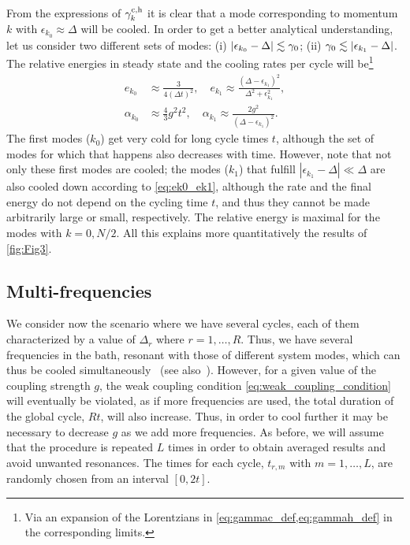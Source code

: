 \documentclass[aps,prx,twocolumn,superscriptaddress,nofootinbib,nolongbibliography,nobalancelastpage,10pt,floatfix]{revtex4-2}
\begin{document}
From the expressions of $\gamma^{\rm c,h}_k$ it is clear that a mode corresponding to momentum $k$ with $\epsilon_{k_0}\approx \Delta$ will be cooled. In order to get a better analytical understanding, let us consider two different sets of modes: (i) $|\epsilon_{k_0}- \Delta|\lesssim \gamma_0$; (ii) $\gamma_0\lesssim |\epsilon_{k_1}- \Delta|$. The relative energies in steady state and the cooling rates per cycle will be\footnote{Via an expansion of the Lorentzians in \cref{eq:gammac_def,eq:gammah_def} in the corresponding limits.}
\begin{align}
    \label{eq:ek0_ek1}
    e_{k_0}      &\approx \frac{3}{4(\Delta t)^2}, \quad  e_{k_1} \approx \frac{(\Delta-\epsilon_{k_1})^2}{\Delta^2+\epsilon_{k_1}^2},\\
    \alpha_{k_0} &\approx \frac{4}{3} g^2 t^2, \quad \alpha_{k_1} \approx \frac{2g^2}{(\Delta-\epsilon_{k_1})^2}.
    \label{eq:alpha01}
\end{align}
The first modes ($k_0$) get very cold for long cycle times $t$, although the set of modes for which that happens also decreases with time. However, note that not only these first modes are cooled; the modes ($k_1$) that fulfill $|\epsilon_{k_1}- \Delta|\ll \Delta$ are also cooled down according to \cref{eq:ek0_ek1}, although the rate and the final energy do not depend on the cycling time $t$, and thus they cannot be made arbitrarily large or small, respectively. The relative energy is maximal for the modes with $k=0,N/2$. All this explains more quantitatively the results of \cref{fig:Fig3}.


\subsection{Multi-frequencies}
\label{subsec:multi_freq}

We consider now the scenario where we have several cycles, each of them characterized by a value of $\Delta_r$ where $r=1,\ldots,R$. Thus, we have several frequencies in the bath, resonant with those of different system modes, which can thus be cooled simultaneously~\cite{Eschner2003Laser} (see also~\cite{Marti2025Efficient}). However, for a given value of the coupling strength $g$, the weak coupling condition \cref{eq:weak_coupling_condition} will eventually be violated, as if more frequencies are used, the total duration of the global cycle, $Rt$, will also increase. Thus, in order to cool further it may be necessary to decrease $g$ as we add more frequencies. As before, we will assume that the procedure is repeated $L$ times in order to obtain averaged results and avoid unwanted resonances. The times for each cycle, $t_{r,m}$ with $m=1,\ldots,L$, are randomly chosen from an interval $[0,2t]$.
\end{document}
